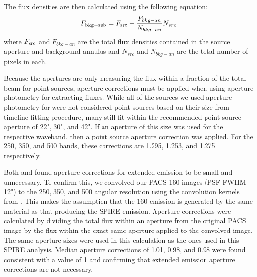 

The flux densities are then calculated using the following equation:
\begin{equation}
F_{\rm{bkg-sub}} = F_{\rm{src}} - \frac{F_{bkg-an}}{N_{bkg-an}}N_{src}
\end{equation}
where $F_{\rm{src}}$ and $F_{bkg-an}$ are the total flux densities contained in the source aperture and background annulus and $N_{src}$ and $N_{bkg-an}$ are the total number of pixels in each.

Because the apertures are only measuring the flux within a fraction of the total beam for point sources, aperture corrections must be applied when using aperture photometry for extracting fluxes. While all of the sources we used aperture photometry for were not considered point sources based on their size from timeline fitting procedure, many still fit within the recommended point source aperture of 22", 30", and 42". If an aperture of this size was used for the respective waveband, then a point source aperture correction was applied. For the 250, 350, and 500 \um{} bands, these corrections are 1.295, 1.253, and 1.275 respectively. 

Both \citet{Ciesla:2012lq} and \citet{Dale:2012dq} found aperture corrections for extended emission to be small and unnecessary.  To confirm this, we convolved our PACS 160 \um{} images (PSF FWHM 12") to the 250, 350, and 500 \um{} angular resolution using the convolution kernels from \citet{Aniano:2011rr}. This makes the assumption that the 160 \um{} emission is generated by the same material as that producing the SPIRE emission. Aperture corrections were calculated by dividing the total flux within an aperture from the original PACS image by the flux within the exact same aperture applied to the convolved image. The same aperture sizes were used in this calculation as the ones used in this SPIRE analysis. Median aperture corrections of 1.01, 0.98, and 0.98 were found consistent with a value of 1 and confirming that extended emission aperture corrections are not necessary.
  